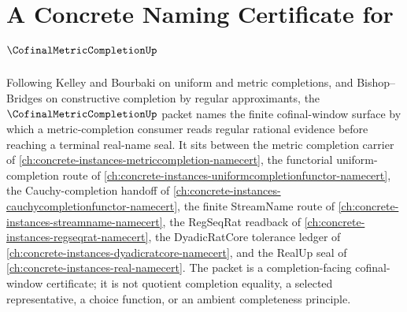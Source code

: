 \chapter{A Concrete Naming Certificate for $\CofinalMetricCompletionUp$}
\label{ch:concrete-instances-cofinal-metric-completion-namecert}

Following Kelley and Bourbaki on uniform and metric completions, and Bishop--Bridges on constructive completion by regular approximants, the $\CofinalMetricCompletionUp$ packet names the finite cofinal-window surface by which a metric-completion consumer reads regular rational evidence before reaching a terminal real-name seal. It sits between the metric completion carrier of \autoref{ch:concrete-instances-metriccompletion-namecert}, the functorial uniform-completion route of \autoref{ch:concrete-instances-uniformcompletionfunctor-namecert}, the Cauchy-completion handoff of \autoref{ch:concrete-instances-cauchycompletionfunctor-namecert}, the finite StreamName route of \autoref{ch:concrete-instances-streamname-namecert}, the RegSeqRat readback of \autoref{ch:concrete-instances-regseqrat-namecert}, the DyadicRatCore tolerance ledger of \autoref{ch:concrete-instances-dyadicratcore-namecert}, and the RealUp seal of \autoref{ch:concrete-instances-real-namecert}. The packet is a completion-facing cofinal-window certificate; it is not quotient completion equality, a selected representative, a choice function, or an ambient completeness principle.

